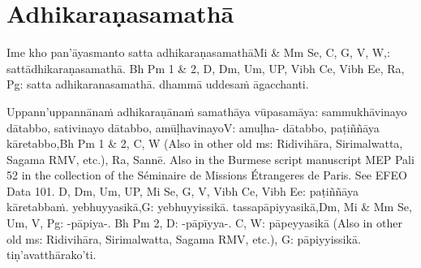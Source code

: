 
\section{Adhikaraṇasamathā}
\label{adhi}

\begin{intro}
	Ime kho pan'āyasmanto satta adhikaraṇasamathā\makeatletter\hyperlink{endnote-appendix}\makeatother Mi & Mm Se, C, G, V, W,:  sattādhikaraṇasamathā. Bh Pm 1 & 2, D, Dm, Um, UP, Vibh Ce, Vibh Ee, Ra, Pg:  satta
adhikaranasamathā. dhammā uddesaṁ āgacchanti.
\end{intro}

Uppann'uppannānaṁ adhikaraṇānaṁ samathāya vūpasamāya: sammukhāvinayo dātabbo, sativinayo dātabbo, amūḷhavinayo\makeatletter\hyperlink{endnote-appendix}\makeatother V: amuḷha- dātabbo, paṭiññāya kāretabbo,\makeatletter\hyperlink{endnote-appendix}\makeatother Bh Pm 1 & 2, C, W (Also in other old ms: Ridivihāra, Sirimalwatta, Sagama RMV, etc.), Ra, Sannē. Also in the Burmese
script manuscript MEP Pali 52 in the collection of the Séminaire de Missions Étrangeres de Paris. See EFEO Data 101.
D, Dm, Um, UP, Mi Se, G, V, Vibh Ce, Vibh Ee: paṭiññāya kāretabbaṁ. yebhuyyasikā,\makeatletter\hyperlink{endnote-appendix}\makeatother G: yebhuyyissikā. tassapāpiyyasikā,\makeatletter\hyperlink{endnote-appendix}\makeatother Dm, Mi & Mm Se, Um, V, Pg: -pāpiya-. Bh Pm 2, D: -pāpīyya-. C, W:  pāpeyyasikā  (Also in other old ms: Ridivihāra,
Sirimalwatta, Sagama RMV, etc.), G: pāpiyyissikā. tiṇ'avatthārako'ti.

\medskip

